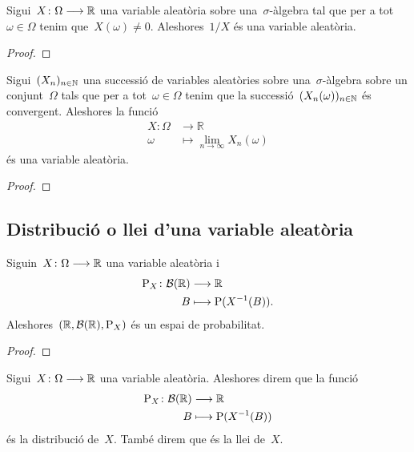 \documentclass[../../main.tex]{subfiles}
\begin{document}
    \begin{proposition}
        \label{prop:les variables aleatòries formen un cos}
        Sigui~\(X\colon\Omega\longrightarrow\mathbb{R}\) una variable aleatòria sobre una~\(\sigma\)-àlgebra tal que per a tot~\(\omega\in\Omega\) tenim que~\(X(\omega)\neq0\).
        Aleshores~\(1/X\) és una variable aleatòria.
        \begin{proof}
        \end{proof}
    \end{proposition}
    \begin{proposition}
        \label{prop:el cos de variables aleatòries és tancat}
        Sigui~\((X_{n})_{n\in\mathbb{N}}\) una successió de variables aleatòries sobre una~\(\sigma\)-àlgebra sobre un conjunt~\(\Omega\) tals que per a tot~\(\omega\in\Omega\) tenim que la successió~\((X_{n}(\omega))_{n\in\mathbb{N}}\) és convergent.
        Aleshores la funció
        \begin{align*}
            X\colon\Omega&\longrightarrow\mathbb{R} \\
            \omega&\longmapsto\lim_{n\to\infty}X_{n}(\omega)
        \end{align*}
        és una variable aleatòria.
        \begin{proof}
        \end{proof}
    \end{proposition}
\subsection{Distribució o llei d'una variable aleatòria}
    \begin{proposition}
        \label{prop:distribució d'una variable aleatòria}
        Siguin~\(X\colon\Omega\longrightarrow\mathbb{R}\) una variable aleatòria i
        \begin{align*}
            \mathrm{P}_{X}\colon\mathcal{B}(\mathbb{R})&\longrightarrow\mathbb{R} \\
            B&\longmapsto\mathrm{P}(X^{-1}(B)).
        \end{align*}
        Aleshores~\((\mathbb{R},\mathcal{B}(\mathbb{R}),\mathrm{P}_{X})\) és un espai de probabilitat.
        \begin{proof}
        \end{proof}
    \end{proposition}
    \begin{definition}
        \label{def:distribució d'una variable aleatòria}
        Sigui~\(X\colon\Omega\longrightarrow\mathbb{R}\) una variable aleatòria.
        Aleshores direm que la funció
        \begin{align*}
            \mathrm{P}_{X}\colon\mathcal{B}(\mathbb{R})&\longrightarrow\mathbb{R} \\
            B&\longmapsto\mathrm{P}(X^{-1}(B))
        \end{align*}
        és la distribució de~\(X\).
        També direm que és la llei de~\(X\).
    \end{definition}
    \begin{example}
    \end{example}
\end{document}
